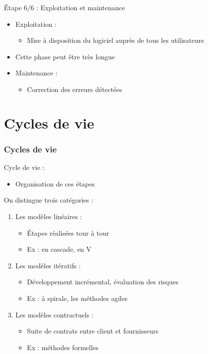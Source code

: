 \documentclass[14pt]{beamer}
\begin{document}
\begin{framentitle}{Étape 6/6 : Exploitation et maintenance}
    \begin{itemize}
        \item Exploitation :
            \begin{itemize}
                \item Mise à disposition du logiciel auprès de tous les
                    utilisateurs
            \end{itemize}
        \item Cette phase peut être très longue
        \item Maintenance :
            \begin{itemize}
                \item Correction des erreurs détectées
            \end{itemize}
    \end{itemize}
\end{framentitle}

\section{Cycles de vie}
\begin{frame}
    \frametitle{Cycles de vie}
    Cycle de vie :
    \begin{itemize}
        \item Organisation de ces étapes
    \end{itemize}
    On distingue trois catégories :
    \begin{enumerate}
        \item Les modèles linéaires :
            \begin{itemize}
                \item Étapes réalisées tour à tour
                \item Ex : en cascade, en V
            \end{itemize}
        \item Les modèles itératifs :
            \begin{itemize}
                \item Développement incrémental, évaluation des risques
                \item Ex : à spirale, les méthodes agiles
            \end{itemize}
        \item Les modèles contractuels :
            \begin{itemize}
                \item Suite de contrats entre client et fournisseurs
                \item Ex : méthodes formelles
            \end{itemize}
    \end{enumerate}
\end{frame}
\end{document}
